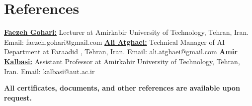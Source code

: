 \documentclass[a4paper,12pt]{article}
\begin{document}
\section{References}
\textbf{\href{https://scholar.google.com/citations?user=7bpNAlAAAAAJ&hl=en}{Faezeh Gohari:}} Lecturer at Amirkabir University of Technology, Tehran, Iran.
\newline Email: faezeh.gohari@gmail.com \newline
\textbf{\href{https://scholar.google.com/citations?user=a_mSCasAAAAJ&hl=en&oi=ao}{Ali Atghaei:}} Technical Manager of AI Department at Faraadid , Tehran, Iran.
\newline Email: ali.atghaei@gmail.com \newline
\textbf{\href{https://scholar.google.com/citations?user=oISEZIUAAAAJ&hl=en&oi=ao}{Amir Kalbasi:}} Assistant Professor at Amirkabir University of Technology, Tehran, Iran.
\newline Email: kalbasi@aut.ac.ir \newline
\newline
\newline


\begin{center}
    \textbf{All certificates, documents, and other references are available upon request.}
\end{center}
\end{document}
